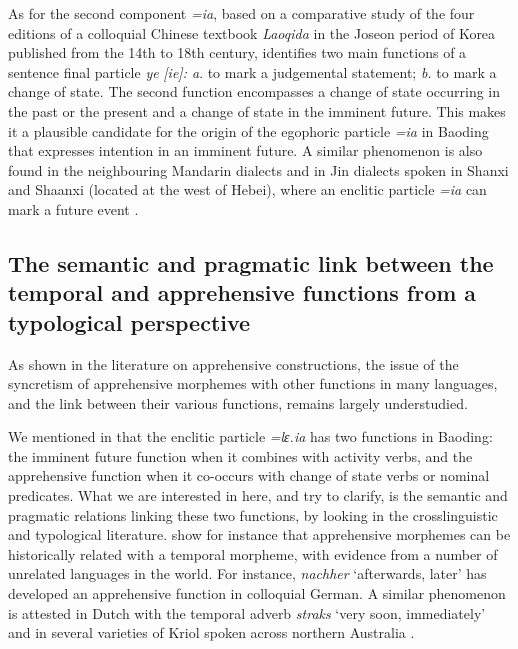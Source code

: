 \documentclass[output=paper,colorlinks,citecolor=brown, language=chinese]{langscibook}
\begin{document}
As for the second component \textit{=ia}, based on a comparative study of the four editions of a colloquial Chinese textbook \textit{Laoqida} in the Joseon period of Korea published from the 14th to 18th century, \citet{Takekoshi2002} identifies two main functions of a sentence final particle \textit{ye} \textit{[ie]: a}. to mark a judgemental statement; \textit{b.} to mark a change of state. The second function encompasses a change of state occurring in the past or the present and a change of state in the imminent future. This makes it a plausible candidate for the origin of the egophoric particle \textit{=ia} in Baoding that expresses intention in an imminent future. A similar phenomenon is also found in the neighbouring Mandarin dialects and in Jin dialects spoken in Shanxi and Shaanxi (located at the west of Hebei), where an enclitic particle \textit{=ia} can mark a future event \citep{Xing2002,Xing2005,Lü1995,Shi2004}. 




\subsection{The semantic and pragmatic link between the temporal and apprehensive functions from a typological perspective}
\label{subsec:sempraglink}

As shown in the literature on apprehensive constructions, the issue of the syncretism of apprehensive morphemes with other functions in many languages, and the link between their various functions, remains largely understudied.

We mentioned in   that the enclitic particle \textit{=lɛ.ia} has two functions in Baoding: the imminent future function when it combines with activity verbs, and the apprehensive function when it co-occurs with change of state verbs or nominal predicates. What we are interested in here, and try to clarify, is the semantic and pragmatic relations linking these two functions, by looking in the crosslinguistic and typological literature. \citet{AngeloSchultze-Berndt2016} show for instance that apprehensive morphemes can be historically related with a temporal morpheme, with evidence from a number of unrelated languages in the world. For instance, \textit{nachher} `afterwards, later' has developed an apprehensive function in colloquial German. A similar phenomenon is attested in Dutch with the temporal adverb \textit{straks} `very soon, immediately' and in several varieties of Kriol spoken across northern Australia \citep{boogaart2009,boogaart2020,AngeloSchultze-Berndt2016}.
\end{document}
